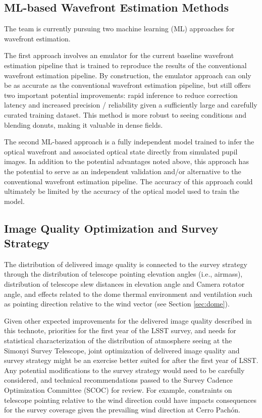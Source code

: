 \documentclass[SO,lsst,authoryear,toc]{lsstdoc}
\begin{document}
\subsection{ML-based Wavefront Estimation Methods}
\label{sec:aos_ml}

The team is currently pursuing two machine learning (ML) approaches for wavefront estimation.

The first approach involves an emulator for the current baseline wavefront estimation pipeline that is trained to reproduce the results of the conventional wavefront estimation pipeline.
By construction, the emulator approach can only be as accurate as the conventional wavefront estimation pipeline, but still offers two important potential improvements: rapid inference to reduce correction latency and increased precision / reliability given a sufficiently large and carefully curated training dataset.
This method is more robust to seeing conditions and blending donuts, making it valuable in dense fields.

The second ML-based approach is a fully independent model trained to infer the optical wavefront and associated optical state directly from simulated pupil images.
In addition to the potential advantages noted above, this approach has the potential to serve as an independent validation and/or alternative to the conventional wavefront estimation pipeline.
The accuracy of this approach could ultimately be limited by the accuracy of the optical model used to train the model.

\subsection{Image Quality Optimization and Survey Strategy}
\label{sec:survey_strategy}

The distribution of delivered image quality is connected to the survey strategy through the distribution of telescope pointing elevation angles (i.e., airmass), distribution of telescope slew distances in elevation angle and Camera rotator angle, and effects related to the dome thermal environment and ventilation such as pointing direction relative to the wind vector (see Section \ref{sec:dome}).

Given other expected improvements for the delivered image quality described in this technote, priorities for the first year of the LSST survey, and needs for statistical characterization of the distribution of atmosphere seeing at the Simonyi Survey Telescope, joint optimization of delivered image quality and survey strategy might be an exercise better suited for after the first year of LSST.
Any potential modifications to the survey strategy would need to be carefully considered, and technical recommendations passed to the Survey Cadence Optimization Committee (SCOC) for review.
For example, constraints on telescope pointing relative to the wind direction could have impacts consequences for the survey coverage given the prevailing wind direction at Cerro Pach\'{o}n.
\end{document}
